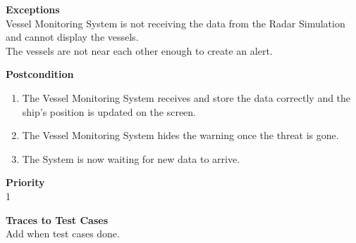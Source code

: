 \noindent
{\bf Exceptions}\\
Vessel Monitoring System is not receiving the data from the Radar Simulation and cannot display the vessels.\\
The vessels are not near each other enough to create an alert.

\noindent
{\bf Postcondition}\\
\vspace*{-0.2in}
\begin{enumerate}
\item The Vessel Monitoring System receives and store the data correctly and the ship's position is updated on the screen.
\item The Vessel Monitoring System hides the warning once the threat is gone.
\item The System is now waiting for new data to arrive.
\end{enumerate}

\noindent
{\bf Priority}\\
1

\noindent
{\bf Traces to Test Cases}\\
Add when test cases done.
